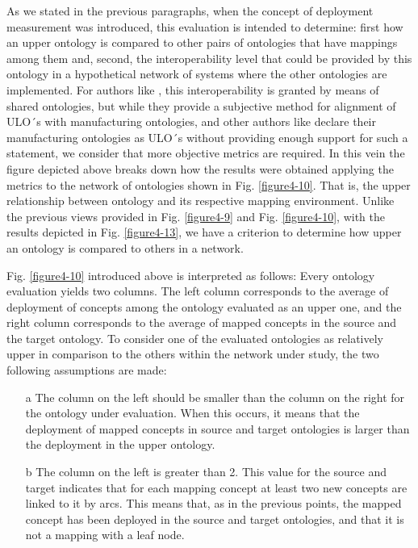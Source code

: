 As we stated in the previous paragraphs, when the concept of deployment measurement  was introduced, this evaluation is intended to determine: first how an upper ontology is compared to other pairs of ontologies that have mappings among them and, second, the interoperability level  that could be provided by this ontology in a hypothetical network of systems where the other ontologies are implemented. For authors like \cite{borgo_role_2004}, this interoperability is granted by means of shared ontologies, but while they provide a subjective method for alignment of ULO´s with manufacturing ontologies, and other authors like \cite{lemaignan_mason:_2006} declare their manufacturing ontologies as ULO´s without providing enough support for such a statement, we consider that more objective metrics are required. In this vein the figure depicted above breaks down how the results were obtained applying the metrics to the network of ontologies shown in Fig. \ref{figure4-10}. That is, the upper relationship between ontology and its respective mapping environment. Unlike the previous  views provided in Fig. \ref{figure4-9} and Fig. \ref{figure4-10}, with the results depicted in Fig. \ref{figure4-13}, we have a criterion to determine how upper an ontology is compared to others in a network. 


Fig. \ref{figure4-10} introduced above is interpreted as follows: Every ontology evaluation yields two columns. The left column corresponds to the average of  deployment of concepts among the ontology evaluated as an upper one, and the right column corresponds to the  average of mapped   concepts in the source and the target ontology. To consider one of the evaluated ontologies as relatively upper in comparison to the others within the network under study, the two following assumptions are made:

\begin{itemize}
	\item [a] The column on the left should be smaller than the column on the right for the ontology under evaluation. When this occurs, it means that the deployment of mapped concepts in source and target ontologies is larger than the deployment in the upper ontology.
	
	\item [b] The column on the left is greater than 2. This value for the source and target indicates that for each mapping concept at least two new concepts are linked to it by arcs. This means that, as in the previous points, the mapped concept has been deployed in the source and target ontologies, and that it is not a mapping with a leaf node.
	
\end{itemize}

